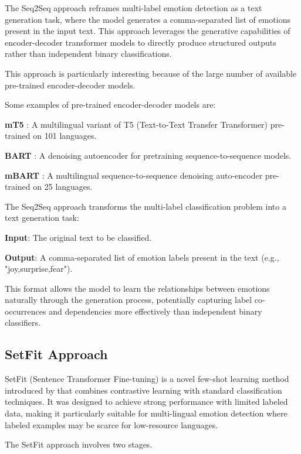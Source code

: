 \documentclass[a4paper,12pt]{extarticle}
\begin{document}
The Seq2Seq approach reframes multi-label emotion detection as a text generation task, where the model generates a comma-separated list of emotions present in the input text. This approach leverages the generative capabilities of encoder-decoder transformer models to directly produce structured outputs rather than independent binary classifications.

This approach is particularly interesting because of the large number of available pre-trained encoder-decoder models.

Some examples of pre-trained encoder-decoder models are:

\textbf{mT5} \cite{xue2021mt5massivelymultilingualpretrained}: A multilingual variant of T5 (Text-to-Text Transfer Transformer) pre-trained on 101 languages. 

\textbf{BART} \cite{lewis2019bartdenoisingsequencetosequencepretraining}: A denoising autoencoder for pretraining sequence-to-sequence models. 

\textbf{mBART} \cite{liu2020multilingualdenoisingpretrainingneural}: A multilingual sequence-to-sequence denoising auto-encoder pre-trained on 25 languages.

The Seq2Seq approach transforms the multi-label classification problem into a text generation task:

\textbf{Input}: The original text to be classified. 

\textbf{Output}: A comma-separated list of emotion labels present in the text (e.g., "joy,surprise,fear").

This format allows the model to learn the relationships between emotions naturally through the generation process, potentially capturing label co-occurrences and dependencies more effectively than independent binary classifiers.

\subsection{SetFit Approach}

SetFit (Sentence Transformer Fine-tuning) is a novel few-shot learning method introduced by \cite{tunstall2022efficient} that combines contrastive learning with standard classification techniques. It was designed to achieve strong performance with limited labeled data, making it particularly suitable for multi-lingual emotion detection where labeled examples may be scarce for low-resource languages.

The SetFit approach involves two stages. 
\end{document}
